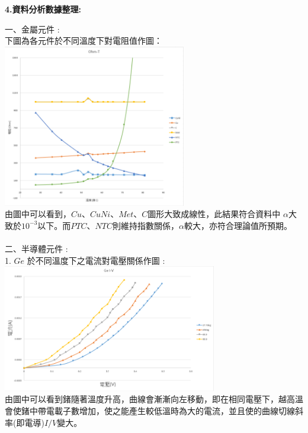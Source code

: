 \documentclass[UTF8]{ctexart}
\begin{document}
\begin{CJK*}{UTF8}{song}
\begin{large}
\textbf{4.資料分析數據整理: } \\
\end{large}
一、金屬元件 :  \\
下圖為各元件於不同溫度下對電阻值作圖： \\
\includegraphics[width = 0.6\textwidth]{ohmt.png} \\
由圖中可以看到，$Cu$、$CuNi$、$Met$、$C$圖形大致成線性，此結果符合資料中 $\alpha$大致於$10^{-3}$以下。而$PTC$、$NTC$則維持指數關係，$\alpha$較大，亦符合理論值所預期。 \\
 \\
二、半導體元件 :  \\
1. $Ge$ 於不同溫度下之電流對電壓關係作圖 :  \\
\includegraphics[width = 0.7\textwidth]{geAll.png} \\
由圖中可以看到鍺隨著溫度升高，曲線會漸漸向左移動，即在相同電壓下，越高溫會使鍺中帶電載子數增加，使之能產生較低溫時為大的電流，並且使的曲線切線斜率(即電導)$I/V$變大。 \\
\newpage


\end{CJK*}
\end{document}
